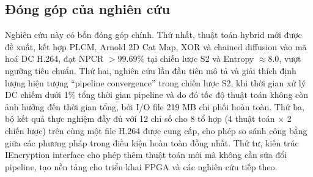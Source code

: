 \subsection{Đóng góp của nghiên cứu}

Nghiên cứu này có bốn đóng góp chính. Thứ nhất, thuật toán hybrid mới được đề xuất, kết hợp PLCM, Arnold 2D Cat Map, XOR và chained diffusion vào mã hoá DC H.264, đạt NPCR $> 99.69\%$ tại chiến lược S2 và Entropy $\approx 8.0$, vượt ngưỡng tiêu chuẩn. Thứ hai, nghiên cứu lần đầu tiên mô tả và giải thích định lượng hiện tượng ``pipeline convergence'' trong chiến lược S2, khi thời gian xử lý DC chiếm dưới 1\% tổng thời gian pipeline và do đó tốc độ thuật toán không còn ảnh hưởng đến thời gian tổng, bởi I/O file 219 MB chi phối hoàn toàn. Thứ ba, bộ kết quả thực nghiệm đầy đủ với 12 chỉ số cho 8 tổ hợp (4 thuật toán $\times$ 2 chiến lược) trên cùng một file H.264 được cung cấp, cho phép so sánh công bằng giữa các phương pháp trong điều kiện hoàn toàn đồng nhất. Thứ tư, kiến trúc IEncryption interface cho phép thêm thuật toán mới mà không cần sửa đổi pipeline, tạo nền tảng cho triển khai FPGA và các nghiên cứu tiếp theo.

